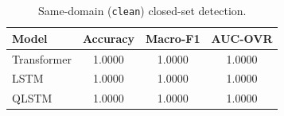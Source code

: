 \begin{table}[t]
\centering
\caption{Same-domain (\texttt{clean}) closed-set detection.}
\label{tab:closed-set}
\begin{tabular}{lccc}
\toprule
Model & Accuracy & Macro-F1 & AUC-OVR \\
\midrule
Transformer & 1.0000 & 1.0000 & 1.0000 \\
LSTM & 1.0000 & 1.0000 & 1.0000 \\
QLSTM & 1.0000 & 1.0000 & 1.0000 \\
\bottomrule
\end{tabular}
\end{table}
